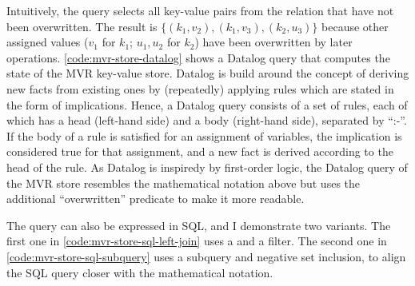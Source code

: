 Intuitively, the query selects all key-value pairs from the  relation
that have not been overwritten.
The result is \(\{ (k_1, v_2), (k_1, v_3), (k_2, u_3)\}\) because other assigned values
(\(v_1\) for \(k_1\); \(u_1, u_2\) for \(k_2\)) have been overwritten by later operations.
\ref{code:mvr-store-datalog} shows a Datalog query that computes the state of the
\ac{MVR} key-value store.
Datalog is build around the concept of deriving new facts from existing ones
by (repeatedly) applying rules which are stated in the form of implications.
Hence, a Datalog query consists of a set of rules, each of which has a
head (left-hand side) and a body (right-hand side), separated by ``:-''.
If the body of a rule is satisfied for an assignment of variables,
the implication is considered true for that assignment,
and a new fact is derived according to the head of the rule.
As Datalog is inspiredy by first-order logic, the Datalog query of the \ac{MVR}
store resembles the mathematical notation above but uses the
additional ``overwritten'' predicate to make it more readable.

The query can also be expressed in SQL, and I demonstrate two variants.
The first one in \ref{code:mvr-store-sql-left-join} uses a 
and a  filter.
The second one in \ref{code:mvr-store-sql-subquery} uses a subquery
and negative set inclusion, to align the SQL query closer with the mathematical
notation.

